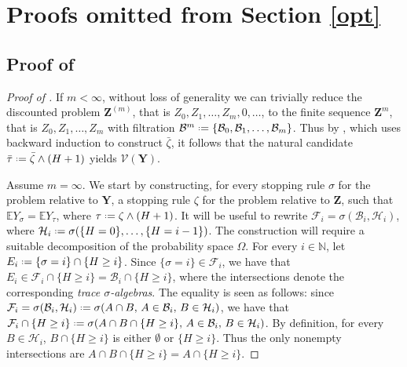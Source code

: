 \documentclass[11pt, a4paper, twoside]{article}
\newcommand*{\defeq}{\mathrel{\vcenter{\baselineskip0.5ex \lineskiplimit0pt
			\hbox{\scriptsize.}\hbox{\scriptsize.}}}=}
\newcommand{\ssup}[1]{{\scriptscriptstyle{({#1})}}}
\newcommand{\NN}{\mathbb{N}}
\newcommand{\EE}{\mathbb{E}}
\newcommand{\FF}{\mathcal{F}}
\newcommand{\HH}{\mathcal{H}}
\newcommand{\Val}{\mathcal{V}}
\newcommand{\YY}{\mathbf{Y}}
\newcommand{\DZ}{\mathbf{Z}}
\newcommand{\DF}{\mathcal{B}}
\numberwithin{equation}{section}
\begin{document}
        \section{Proofs omitted from Section \ref{opt}}\label{suppopt}
        
        \subsection{Proof of }
        \begin{proof}[Proof of ]
		If $m<\infty$, without loss of generality we can trivially reduce the discounted problem $\DZ^\ssup{m}$, that is $Z_0, Z_1, \ldots, Z_m, 0,\ldots$, to the finite sequence $\DZ^m$, that is $Z_0, Z_1, \ldots, Z_m$ with filtration $\DF^m\defeq \{\DF_0,\DF_1,\ldots,\DF_m\}$. Thus by \cite[Theorem~2.1]{Sam96}, which uses backward induction \cite[Theorem~3.2]{ChoRobSieg71} to construct $\bar{\zeta}$, it follows that the natural candidate $\bar{\tau}\defeq \bar{\zeta}\wedge (H+1)$ yields $\Val(\YY)$.
		
		Assume $m=\infty$.	We start by constructing, for every stopping rule $\sigma$ for the problem relative to $\YY$, a stopping rule $\zeta$ for the problem relative to $\DZ$, such that $\EE Y_\sigma=\EE Y_\tau$, where $\tau\defeq\zeta\wedge(H+1)$. It will be useful to rewrite $\FF_i=\sigma(\DF_i,\HH_{i})$, where $\HH_i\defeq\sigma(\{H=0\},\ldots,\{H=i-1\})$. The construction will require a suitable decomposition of the probability space $\Omega$. For every $i\in\NN$, let $E_i\defeq\{\sigma = i\}\cap\{H\ge i\}$. Since $\{\sigma = i\}\in\FF_i$, we have that $E_i\in\FF_i\cap\{H\ge i\}=\DF_i\cap\{H\ge i\}$, where the intersections denote the corresponding \textit{trace $\sigma$-algebras}. The equality is seen as follows: since  $\FF_i=\sigma(\DF_i,\HH_{i})\defeq\sigma(A\cap B,\, A\in\DF_i,\, B\in\HH_i)$, we have that $\FF_i\cap\{H\ge i\}\defeq\sigma(A\cap B\cap\{H\ge i\},\, A\in\DF_i,\, B\in\HH_i)$. By definition, for every $B\in\HH_i$, $B\cap\{H\ge i\}$ is either $\emptyset$ or $\{H\ge i\}$. Thus the only nonempty intersections are $A\cap B\cap\{H\ge i\}=A\cap\{H\ge i\}$. 
		

\end{proof}
\end{document}
